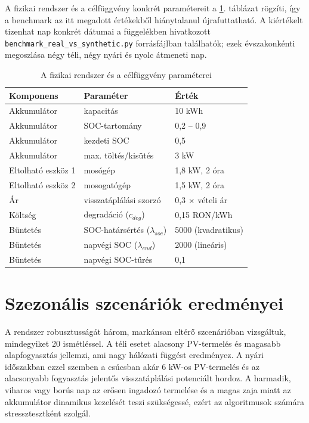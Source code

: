 A fizikai rendszer és a célfüggvény konkrét paramétereit a \ref{tab:sysparams}. táblázat rögzíti, így a benchmark az itt megadott értékekből hiánytalanul újrafuttatható. A kiértékelt tizenhat nap konkrét dátumai a függelékben hivatkozott \texttt{benchmark\_real\_vs\_synthetic.py} forrásfájlban találhatók; ezek évszakonkénti megoszlása négy téli, négy nyári és nyolc átmeneti nap.

\begin{table}[H]
\centering
\caption{A fizikai rendszer és a célfüggvény paraméterei}
\label{tab:sysparams}
\begin{tabular}{lll}
\toprule
Komponens & Paraméter & Érték \\
\midrule
Akkumulátor & kapacitás & 10 kWh \\
Akkumulátor & SOC-tartomány & 0,2 -- 0,9 \\
Akkumulátor & kezdeti SOC & 0,5 \\
Akkumulátor & max. töltés/kisütés & 3 kW \\
\midrule
Eltolható eszköz 1 & mosógép & 1,8 kW, 2 óra \\
Eltolható eszköz 2 & mosogatógép & 1,5 kW, 2 óra \\
\midrule
Ár & visszatáplálási szorzó & 0,3 $\times$ vételi ár \\
Költség & degradáció ($c_{deg}$) & 0,15 RON/kWh \\
\midrule
Büntetés & SOC-határsértés ($\lambda_{soc}$) & 5000 (kvadratikus) \\
Büntetés & napvégi SOC ($\lambda_{end}$) & 2000 (lineáris) \\
Büntetés & napvégi SOC-tűrés & 0,1 \\
\bottomrule
\end{tabular}
\end{table}

\section{Szezonális szcenáriók eredményei}
A rendszer robusztusságát három, markánsan eltérő szcenárióban vizsgáltuk, mindegyiket 20 ismétléssel. A téli esetet alacsony PV-termelés és magasabb alapfogyasztás jellemzi, ami nagy hálózati függést eredményez. A nyári időszakban ezzel szemben a csúcsban akár 6 kW-os PV-termelés és az alacsonyabb fogyasztás jelentős visszatáplálási potenciált hordoz. A harmadik, viharos vagy borús nap az erősen ingadozó termelése és a magas zaja miatt az akkumulátor dinamikus kezelését teszi szükségessé, ezért az algoritmusok számára stressztesztként szolgál.

